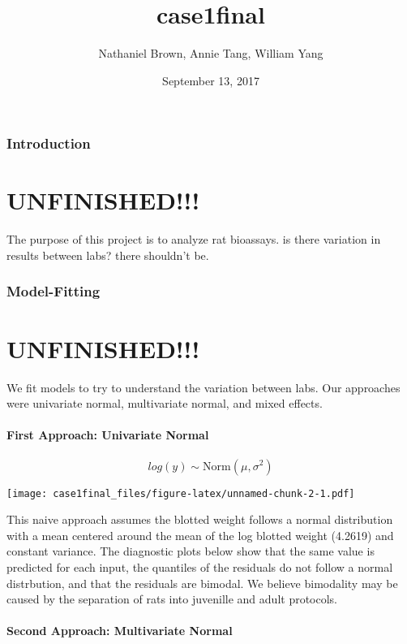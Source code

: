 \documentclass[]{article}
\title{case1final}
\author{Nathaniel Brown, Annie Tang, William Yang}
\date{September 13, 2017}
\let\oldparagraph\paragraph
\renewcommand{\paragraph}[1]{\oldparagraph{#1}\mbox{}}
\begin{document}
\maketitle

\subsubsection{Introduction}\label{introduction}

\section{UNFINISHED!!!}\label{unfinished}

The purpose of this project is to analyze rat bioassays. is there
variation in results between labs? there shouldn't be.

\subsubsection{Model-Fitting}\label{model-fitting}

\section{UNFINISHED!!!}\label{unfinished-1}

We fit models to try to understand the variation between labs. Our
approaches were univariate normal, multivariate normal, and mixed
effects.

\paragraph{First Approach: Univariate
Normal}\label{first-approach-univariate-normal}

\[
log(y) \sim \text{Norm}(\mu , \sigma^2)
\]

\texttt{[image: case1final\_files/figure-latex/unnamed-chunk-2-1.pdf]}

This naive approach assumes the blotted weight follows a normal
distribution with a mean centered around the mean of the log blotted
weight (4.2619) and constant variance. The diagnostic plots below show
that the same value is predicted for each input, the quantiles of the
residuals do not follow a normal distrbution, and that the residuals are
bimodal. We believe bimodality may be caused by the separation of rats
into juvenille and adult protocols.

\paragraph{Second Approach: Multivariate
Normal}\label{second-approach-multivariate-normal}
\end{document}
